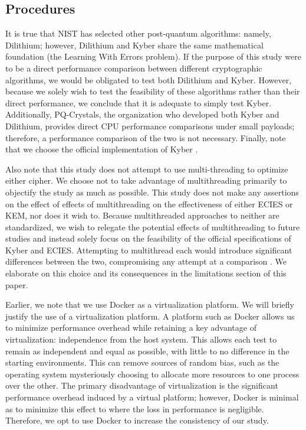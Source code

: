 \documentclass[a4paper]{article}
\begin{document}
\subsection{Procedures}\label{procedures}

It is true that NIST has selected other post-quantum algorithms: namely,
Dilithium; however, Dilithium and Kyber share the same mathematical
foundation (the Learning With Errors problem). If the purpose of this
study were to be a direct performance comparison between different
cryptographic algorithms, we would be obligated to test both Dilithium
and Kyber. However, because we solely wish to test the feasibility of
these algorithms rather than their direct performance, we conclude that
it is adequate to simply test Kyber. Additionally, PQ-Crystals, the
organization who developed both Kyber and Dilithium, provides direct CPU
performance comparisons under small payloads; therefore, a performance
comparison of the two is not necessary. Finally, note that we choose the
official implementation of Kyber
\autocite{hekkalaImplementingPostquantumCryptography2023}.

Also note that this study does not attempt to use multi-threading to
optimize either cipher. We choose not to take advantage of
multithreading primarily to objectify the study as much as possible.
This study does not make any assertions on the effect of effects of
multithreading on the effectiveness of either ECIES or KEM, nor does it
wish to. Because multithreaded approaches to neither are standardized,
we wish to relegate the potential effects of multithreading to future
studies and instead solely focus on the feasibility of the official
specifications of Kyber and ECIES. Attempting to multithread each would
introduce significant differences between the two, compromising any
attempt at a comparison
\autocite{ebrahimiPostQuantumCryptoprocessorsOptimized2019}. We elaborate on
this choice and its consequences in the limitations section of this
paper.

Earlier, we note that we use Docker as a virtualization platform. We
will briefly justify the use of a virtualization platform. A platform
such as Docker allows us to minimize performance overhead while
retaining a key advantage of virtualization: independence from the host
system. This allows each test to remain as independent and equal as
possible, with little to no difference in the starting
environments.\autocite{singhAdvancedLightweightEncryption2017} This can
remove sources of random bias, such as the operating system mysteriously
choosing to allocate more resources to one process over the other. The
primary disadvantage of virtualization is the significant performance
overhead induced by a virtual platform; however, Docker is minimal as to
minimize this effect to where the loss in performance is negligible.
Therefore, we opt to use Docker to increase the consistency of our
study.
\end{document}
